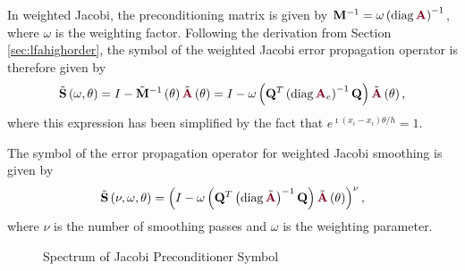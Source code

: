 In weighted Jacobi, the preconditioning matrix is given by $\mathbf{M}^{-1} = \omega \left( \diag {\color{burgundy}\mathbf{A}} \right)^{-1}$, where $\omega$ is the weighting factor.
Following the derivation from Section \ref{sec:lfahighorder}, the symbol of the weighted Jacobi error propagation operator is therefore given by
\begin{equation}
\tilde{\mathbf{S}} \left( \omega, \theta \right) = I - \tilde{\mathbf{M}}^{-1} \left( \theta \right) \tilde{{\color{burgundy}\mathbf{A}}} \left( \theta \right) = I - \omega \left( \mathbf{Q}^T \left( \diag {\color{burgundy}\mathbf{A}}_e \right)^{-1} \mathbf{Q} \right) \tilde{{\color{burgundy}\mathbf{A}}} \left( \theta \right),
\end{equation}
where this expression has been simplified by the fact that $e^{\imath \left( x_i - x_i \right) \theta / h} = 1$.

\begin{definition}
The symbol of the error propagation operator for weighted Jacobi smoothing is given by
\begin{equation}
\tilde{\mathbf{S}} \left( \nu, \omega, \theta \right) = \left( I - \omega \left( \mathbf{Q}^T \left( \diag \tilde{{\color{burgundy}\mathbf{A}}} \right)^{-1} \mathbf{Q} \right) \tilde{{\color{burgundy}\mathbf{A}}} \left( \theta \right) \right)^\nu,
\end{equation}
where $\nu$ is the number of smoothing passes and $\omega$ is the weighting parameter.
\label{def:jacobi_symbol}
\end{definition}

\begin{figure}[!ht]
  \centering
  \hfill
  \caption{Spectrum of Jacobi Preconditioner Symbol}
\end{figure}

